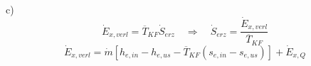 c)
\[
\dot{E}_{x,verl} = \overline{T}_{KF} \dot{S}_{erz} \quad \Rightarrow \quad \dot{S}_{erz} = \frac{\dot{E}_{x,verl}}{\overline{T}_{KF}}
\]
\[
\dot{E}_{x,verl} = \dot{m} \left[ h_{e,in} - h_{e,us} - \overline{T}_{KF} (s_{e,in} - s_{e,us}) \right] + \dot{E}_{x,Q}
\]
